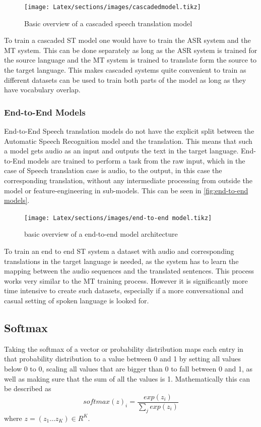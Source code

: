 \begin{figure}[ht]
    \centering%
    \texttt{[image: Latex/sections/images/cascadedmodel.tikz]}
\caption{Basic overview of a cascaded speech translation model}
\label{fig:cascadedmodel}
\end{figure}
To train a cascaded ST model one would have to train the ASR system and the MT system. This can be done separately as long as the ASR system is trained for the source language and the MT system is trained to translate form the source to the target language. This makes cascaded systems quite convenient to train as different datasets can be used to train both parts of the model as long as they have vocabulary overlap. 

\subsubsection{End-to-End Models}
End-to-End Speech translation models do not have the explicit split between the Automatic Speech Recognition model and the translation. This means that such a model gets audio as an input and outputs the text in the target language. 
End-to-End models are trained to perform a task from the raw input, which in the case of Speech translation case is audio, to the output, in this case the corresponding translation, without any intermediate processing from outside the model or feature-engineering in sub-models. This can be seen in \autoref{fig:end-to-end models}. 

\begin{figure}[ht]
    \centering%
    \texttt{[image: Latex/sections/images/end-to-end model.tikz]}

\caption{basic overview of a end-to-end model architecture}
\label{fig:end-to-end models}
\end{figure}

To train an end to end ST system a dataset with audio and corresponding translations in the target language is needed, as the system has to learn the mapping between the audio sequences and the translated sentences. This process works very similar to the MT training process. However it is significantly more time intensive to create such datasets, especially if a more conversational and casual setting of spoken language is looked for. 


\subsection{Softmax}
Taking the softmax of a vector or probability distribution maps each entry in that probability distribution to a value between 0 and 1 by setting all values below 0 to 0, scaling all values that are bigger than 0 to fall between 0 and 1, as well as making sure that the sum of all the values is 1. 
Mathematically this can be described as $$softmax(z)_i=\frac{exp(z_i)}{\sum_j exp(z_i)}$$ where $z=(z_1\dots z_K)\in R^K$.

